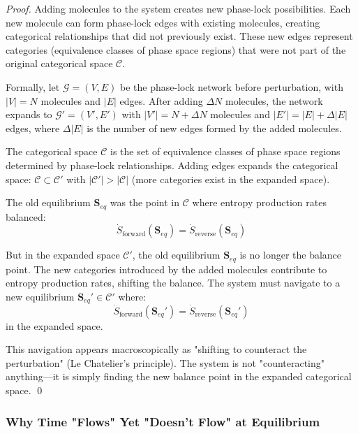\documentclass[12pt,a4paper]{article}
\theoremstyle{definition}
\theoremstyle{remark}
\newcommand{\phaselockgraph}{\mathcal{G}}
\begin{document}
\begin{proof}
Adding molecules to the system creates new phase-lock possibilities. Each new molecule can form phase-lock edges with existing molecules, creating categorical relationships that did not previously exist. These new edges represent categories (equivalence classes of phase space regions) that were not part of the original categorical space $\mathcal{C}$.

Formally, let $\phaselockgraph = (V, E)$ be the phase-lock network before perturbation, with $|V| = N$ molecules and $|E|$ edges. After adding $\Delta N$ molecules, the network expands to $\phaselockgraph' = (V', E')$ with $|V'| = N + \Delta N$ molecules and $|E'| = |E| + \Delta |E|$ edges, where $\Delta |E|$ is the number of new edges formed by the added molecules.

The categorical space $\mathcal{C}$ is the set of equivalence classes of phase space regions determined by phase-lock relationships. Adding edges expands the categorical space: $\mathcal{C} \subset \mathcal{C}'$ with $|\mathcal{C}'| > |\mathcal{C}|$ (more categories exist in the expanded space).

The old equilibrium $\mathbf{S}_{eq}$ was the point in $\mathcal{C}$ where entropy production rates balanced:
\begin{equation}
\dot{S}_{\text{forward}}(\mathbf{S}_{eq}) = \dot{S}_{\text{reverse}}(\mathbf{S}_{eq})
\end{equation}

But in the expanded space $\mathcal{C}'$, the old equilibrium $\mathbf{S}_{eq}$ is no longer the balance point. The new categories introduced by the added molecules contribute to entropy production rates, shifting the balance. The system must navigate to a new equilibrium $\mathbf{S}_{eq}' \in \mathcal{C}'$ where:
\begin{equation}
\dot{S}_{\text{forward}}(\mathbf{S}_{eq}') = \dot{S}_{\text{reverse}}(\mathbf{S}_{eq}')
\end{equation}
in the expanded space.

This navigation appears macroscopically as "shifting to counteract the perturbation" (Le Chatelier's principle). The system is not "counteracting" anything—it is simply finding the new balance point in the expanded categorical space. \qed
\end{proof}

\subsubsection{Why Time "Flows" Yet "Doesn't Flow" at Equilibrium}
\end{document}
